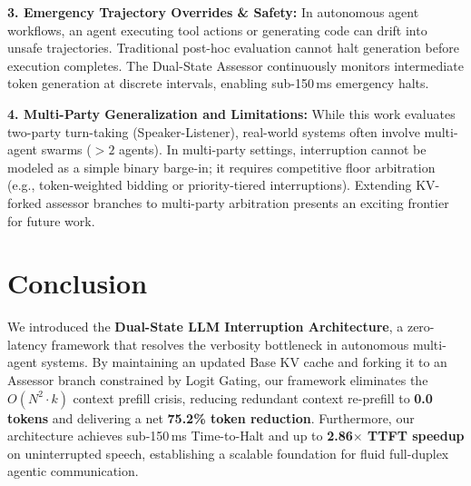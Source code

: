 \documentclass{article}
\begin{document}
\textbf{3. Emergency Trajectory Overrides \& Safety:}
In autonomous agent workflows, an agent executing tool actions or generating code can drift into unsafe trajectories. Traditional post-hoc evaluation cannot halt generation before execution completes. The Dual-State Assessor continuously monitors intermediate token generation at discrete intervals, enabling sub-150\,ms emergency halts.

\textbf{4. Multi-Party Generalization and Limitations:}
While this work evaluates two-party turn-taking (Speaker-Listener), real-world systems often involve multi-agent swarms ($>2$ agents). In multi-party settings, interruption cannot be modeled as a simple binary barge-in; it requires competitive floor arbitration (e.g., token-weighted bidding or priority-tiered interruptions). Extending KV-forked assessor branches to multi-party arbitration presents an exciting frontier for future work.

\section{Conclusion}

We introduced the \textbf{Dual-State LLM Interruption Architecture}, a zero-latency framework that resolves the verbosity bottleneck in autonomous multi-agent systems. By maintaining an updated Base KV cache and forking it to an Assessor branch constrained by Logit Gating, our framework eliminates the $O(N^2 \cdot k)$ context prefill crisis, reducing redundant context re-prefill to \textbf{0.0 tokens} and delivering a net \textbf{75.2\% token reduction}. Furthermore, our architecture achieves sub-150\,ms Time-to-Halt and up to \textbf{2.86$\times$ TTFT speedup} on uninterrupted speech, establishing a scalable foundation for fluid full-duplex agentic communication.
\end{document}
